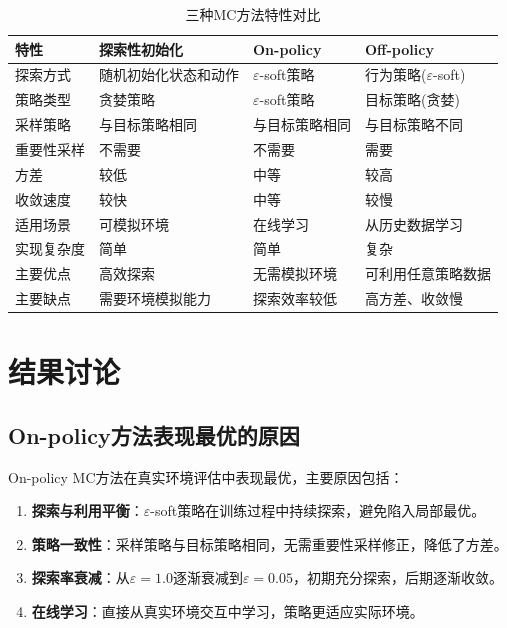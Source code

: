\documentclass[12pt,a4paper]{article}
\begin{document}
\begin{table}[H]
\centering
\caption{三种MC方法特性对比}
\begin{tabular}{p{2.5cm}p{3.5cm}p{3.5cm}p{3.5cm}}
\toprule
\textbf{特性} & \textbf{探索性初始化} & \textbf{On-policy} & \textbf{Off-policy} \\
\midrule
探索方式 & 随机初始化状态和动作 & $\varepsilon$-soft策略 & 行为策略($\varepsilon$-soft) \\
\midrule
策略类型 & 贪婪策略 & $\varepsilon$-soft策略 & 目标策略(贪婪) \\
\midrule
采样策略 & 与目标策略相同 & 与目标策略相同 & 与目标策略不同 \\
\midrule
重要性采样 & 不需要 & 不需要 & 需要 \\
\midrule
方差 & 较低 & 中等 & 较高 \\
\midrule
收敛速度 & 较快 & 中等 & 较慢 \\
\midrule
适用场景 & 可模拟环境 & 在线学习 & 从历史数据学习 \\
\midrule
实现复杂度 & 简单 & 简单 & 复杂 \\
\midrule
主要优点 & 高效探索 & 无需模拟环境 & 可利用任意策略数据 \\
\midrule
主要缺点 & 需要环境模拟能力 & 探索效率较低 & 高方差、收敛慢 \\
\bottomrule
\end{tabular}
\end{table}

\section{结果讨论}

\subsection{On-policy方法表现最优的原因}

On-policy MC方法在真实环境评估中表现最优，主要原因包括：

\begin{enumerate}
    \item \textbf{探索与利用平衡}：$\varepsilon$-soft策略在训练过程中持续探索，避免陷入局部最优。
    
    \item \textbf{策略一致性}：采样策略与目标策略相同，无需重要性采样修正，降低了方差。
    
    \item \textbf{探索率衰减}：从$\varepsilon=1.0$逐渐衰减到$\varepsilon=0.05$，初期充分探索，后期逐渐收敛。
    
    \item \textbf{在线学习}：直接从真实环境交互中学习，策略更适应实际环境。
\end{enumerate}
\end{document}
